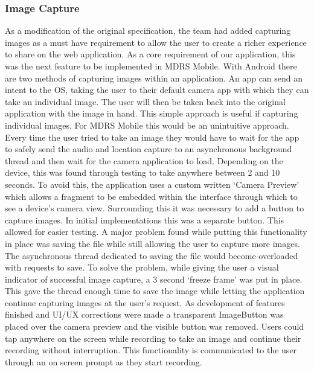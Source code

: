 \documentclass{l3proj}
\begin{document}
\subsubsection{Image Capture}
As a modification of the original specification, the team had added capturing images as a must have requirement to allow the user to create a richer experience to share on the web application. As a core requirement of our application, this was the next feature to be implemented in MDRS Mobile. With Android there are two methods of capturing images within an application. An app can send an intent to the OS, taking the user to their default camera app with which they can take an individual image. The user will then be taken back into the original application with the image in hand. This simple approach is useful if capturing individual images. For MDRS Mobile this would be an unintuitive approach. Every time the user tried to take an image they would have to wait for the app to safely send the audio and location capture to an asynchronous background thread and then wait for the camera application to load. Depending on the device, this was found through testing to take anywhere between 2 and 10 seconds. To avoid this, the application uses a custom written ‘Camera Preview’ which allows a fragment to be embedded within the interface through which to see a device’s camera view. Surrounding this it was necessary to add a button to capture images. In initial implementations this was a separate button. This allowed for easier testing. A major problem found while putting this functionality in place was saving the file while still allowing the user to capture more images. The asynchronous thread dedicated to saving the file would become overloaded with requests to save. To solve the problem, while giving the user a visual indicator of successful image capture, a 3 second ‘freeze frame’ was put in place. This gave the thread enough time to save the image while letting the application continue capturing images at the user’s request. As development of features finished and UI/UX corrections were made a transparent ImageButton was placed over the camera preview and the visible button was removed. Users could tap anywhere on the screen while recording to take an image and continue their recording without interruption. This functionality is communicated to the user through an on screen prompt as they start recording.
\end{document}
